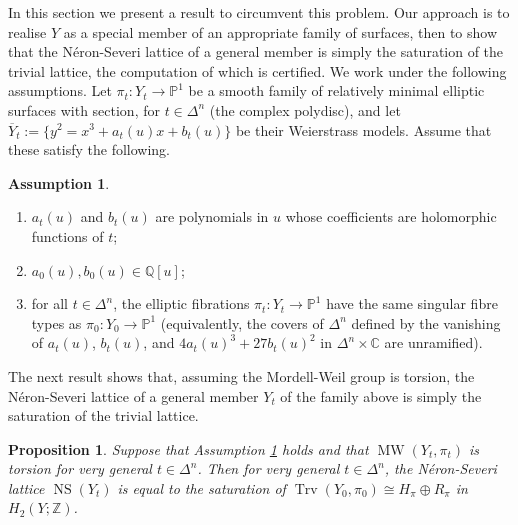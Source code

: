 \documentclass[a4paper]{amsart}
\theoremstyle{definition}
\newtheorem{assumption}[definition]{Assumption}
\theoremstyle{plain}
\newtheorem{proposition}[definition]{Proposition}
\theoremstyle{remark}
\newcommand{\bC}{\mathbb{C}}
\newcommand{\bP}{\mathbb{P}}
\newcommand{\bQ}{\mathbb{Q}}
\newcommand{\bZ}{\mathbb{Z}}
\DeclareMathOperator{\MW}{MW}
\DeclareMathOperator{\NS}{NS}
\DeclareMathOperator{\Trv}{Trv}
\numberwithin{figure}{section}
\numberwithin{table}{section}
\begin{document}
In this section we present a result to circumvent this problem. Our approach is to realise $Y$ as a special member of an appropriate family of surfaces, then to show that the N\'{e}ron-Severi lattice of a general member is simply the saturation of the trivial lattice, the computation of which is certified. We work under the following assumptions. Let $\pi_t\colon {Y}_t \to \bP^1$ be a smooth family of relatively minimal elliptic surfaces with section, for $t \in \Delta^n$ (the complex polydisc), and let $\overline{Y}_t := \{y^2 = x^3 + a_t(u) x + b_t(u)\}$ be their Weierstrass models. Assume that these satisfy the following.

\begin{assumption} \label{ass:analyticfamily}
\begin{enumerate}
\item $a_t(u)$ and $b_t(u)$ are polynomials in $u$ whose coefficients are holomorphic functions of $t$;
\item $a_0(u), b_0(u) \in \bQ[u]$;
\item for all $t \in \Delta^n$, the elliptic fibrations $\pi_t\colon {Y}_t \to \bP^1$ have the same singular fibre types as $\pi_0\colon Y_0 \to \bP^1$ (equivalently, the covers of $\Delta^n$ defined by the vanishing of $a_t(u)$, $b_t(u)$, and $4a_t(u)^3 + 27b_t(u)^2$ in $\Delta^n \times \bC$ are unramified).
\end{enumerate}
\end{assumption}

 The next result shows that, assuming the Mordell-Weil group is torsion, the N\'{e}ron-Severi lattice of a general member $Y_t$ of the family above is simply the saturation of the trivial lattice.

\begin{proposition} \label{prop:torsionMW} Suppose that Assumption \ref{ass:analyticfamily} holds and that $\MW({Y}_t,\pi_t)$ is torsion for very general $t \in \Delta^n$. Then for very general $t \in \Delta^n$, the N\'{e}ron-Severi lattice $\NS({Y}_t)$ is equal to the saturation of $\Trv(Y_0,\pi_0) \cong H_{\pi} \oplus R_{\pi}$ in $H_2(Y;\bZ)$.
\end{proposition}
\end{document}
